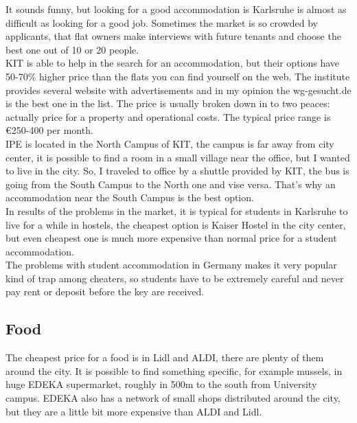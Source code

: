 \documentclass[english]{article}
\begin{document}
It sounds funny, but looking for a good accommodation is Karlsruhe is almost as difficult as looking for a good job. Sometimes the market is so crowded by applicants, that flat owners make interviews with future tenants and choose the best one out of 10 or 20 people.\\

KIT is able to help in the search for an accommodation, but their options have 50-70\% higher price than the flats you can find yourself on the web. The institute provides several website with advertisements and in my opinion the wg-gesucht.de is the best one in the list. The price is usually broken down in to two peaces: actually price for a property and operational costs. The typical price range is \euro250-400 per month.\\ 

IPE is located in the North Campus of KIT, the campus is far away from city center, it is possible to find a room in a small village near the office, but I wanted to live in the city. So, I traveled to office by a shuttle provided by KIT, the bus is going from the South Campus to the North one and vise versa. That's why an accommodation near the South Campus is the best option.\\

In results of the problems in the market, it is typical for students in Karlsruhe to live for a while in hostels, the cheapest option is Kaiser Hostel in the city center, but even cheapest one is much more expensive than normal price for a student accommodation. \\

The problems with student accommodation in Germany makes it very popular kind of trap among cheaters, so students have to be extremely careful and never pay rent or deposit before the key are received.\\

\subsection{Food}

The cheapest price for a food is in Lidl and ALDI, there are plenty of them around the city. It is possible to find something specific, for example mussels, in huge EDEKA supermarket, roughly in 500m to the south from University campus. EDEKA also has a network of small shops distributed around the city, but they are a little bit more expensive than ALDI and Lidl.\\
\end{document}

